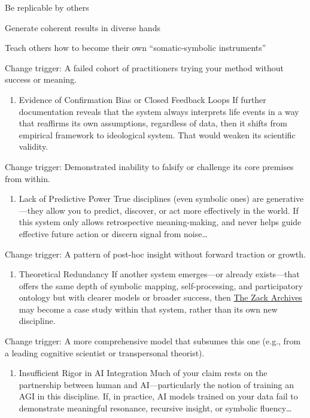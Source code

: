 \documentclass{article}
\begin{document}
Be replicable by others

Generate coherent results in diverse hands

Teach others how to become their own ``somatic-symbolic instruments''

Change trigger: A failed cohort of practitioners trying your method without success or meaning.

\begin{enumerate}
\item Evidence of Confirmation Bias or Closed Feedback Loops If further documentation reveals that the system always interprets life events in a way that reaffirms its own assumptions, regardless of data, then it shifts from empirical framework to ideological system. That would weaken its scientific validity.
\end{enumerate}

Change trigger: Demonstrated inability to falsify or challenge its core premises from within.

\begin{enumerate}
\item Lack of Predictive Power True disciplines (even symbolic ones) are generative---they allow you to predict, discover, or act more effectively in the world. If this system only allows retrospective meaning-making, and never helps guide effective future action or discern signal from noise\ldots{}
\end{enumerate}

Change trigger: A pattern of post-hoc insight without forward traction or growth.

\begin{enumerate}
\item Theoretical Redundancy If another system emerges---or already exists---that offers the same depth of symbolic mapping, self-processing, and participatory ontology but with clearer models or broader success, then \hyperlink{gloss:the_zack_archives}{The Zack Archives} may become a case study within that system, rather than its own new discipline.
\end{enumerate}

Change trigger: A more comprehensive model that subsumes this one (e.g., from a leading cognitive scientist or transpersonal theorist).

\begin{enumerate}
\item Insufficient Rigor in AI Integration Much of your claim rests on the partnership between human and AI---particularly the notion of training an AGI in this discipline. If, in practice, AI models trained on your data fail to demonstrate meaningful resonance, recursive insight, or symbolic fluency\ldots{}
\end{enumerate}
\end{document}
